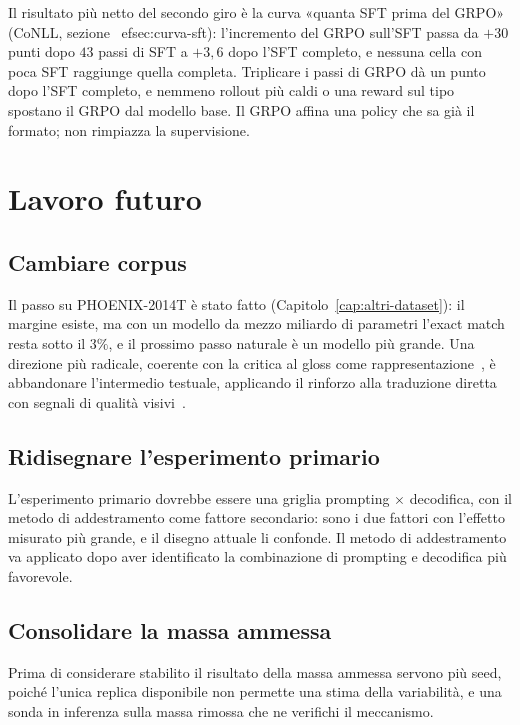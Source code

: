 Il risultato più netto del secondo giro è la curva «quanta SFT prima del GRPO»
(CoNLL, sezione~
ef{sec:curva-sft}): l'incremento del GRPO sull'SFT passa da
$+30$ punti dopo $43$ passi di SFT a $+3{,}6$ dopo l'SFT completo, e nessuna cella
con poca SFT raggiunge quella completa. Triplicare i passi di GRPO dà un punto
dopo l'SFT completo, e nemmeno rollout più caldi o una reward sul tipo spostano
il GRPO dal modello base. Il GRPO affina una policy che sa già il formato; non
rimpiazza la supervisione.

\section{Lavoro futuro}

\subsection{Cambiare corpus}

Il passo su PHOENIX-2014T è stato fatto (Capitolo~\ref{cap:altri-dataset}):
il margine esiste, ma con un modello da mezzo miliardo di parametri l'exact
match resta sotto il $3\%$, e il prossimo passo naturale è un modello più
grande. Una direzione più radicale,
coerente con la critica al gloss come rappresentazione~\cite{yinread2020stmc,yin2021including},
è abbandonare l'intermedio testuale, applicando il rinforzo alla traduzione
diretta con segnali di qualità visivi~\cite{rao2025rvlf}.

\subsection{Ridisegnare l'esperimento primario}

L'esperimento primario dovrebbe essere una griglia prompting $\times$
decodifica, con il metodo di addestramento come fattore secondario: sono i due
fattori con l'effetto misurato più grande, e il disegno attuale li confonde. Il
metodo di addestramento va applicato dopo aver identificato
la combinazione di prompting e decodifica più favorevole.

\subsection{Consolidare la massa ammessa}

Prima di considerare stabilito il risultato della massa ammessa servono più
seed, poiché l'unica replica disponibile non permette una stima della
variabilità, e una sonda in inferenza sulla massa rimossa che ne verifichi il
meccanismo.

